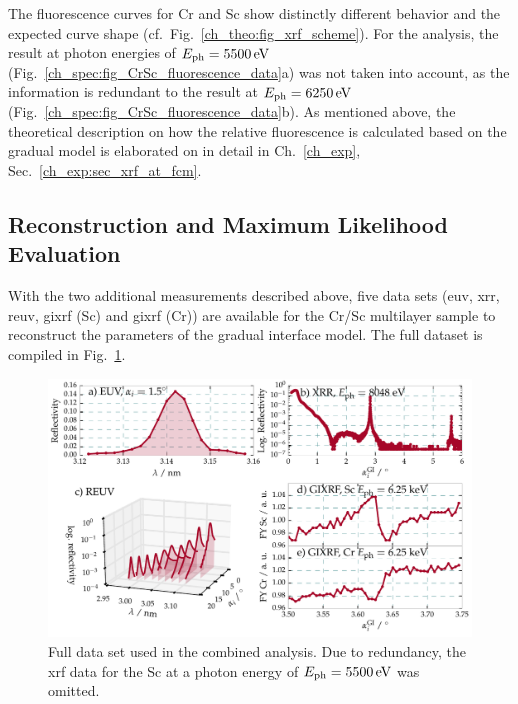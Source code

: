 The fluorescence curves for Cr and Sc show distinctly different behavior and the expected curve shape (cf.~Fig.~\ref{ch_theo:fig_xrf_scheme}). For the analysis, the result at photon energies of $E_\text{ph}=\ev{5500}$ (Fig.~\ref{ch_spec:fig_CrSc_fluorescence_data}a)  was not taken into account, as the information is redundant to the result at  $E_\text{ph}=\ev{6250}$ (Fig.~\ref{ch_spec:fig_CrSc_fluorescence_data}b). As mentioned above, the theoretical description on how the relative fluorescence is calculated based on the gradual model is elaborated on in detail in Ch.~\ref{ch_exp}, Sec.~\ref{ch_exp:sec_xrf_at_fcm}.

\subsection{Reconstruction and Maximum Likelihood Evaluation}
With the two additional measurements described above, five data sets (\gls{euv}, \gls{xrr}, \gls{reuv}, \gls{gixrf} (Sc) and \gls{gixrf} (Cr)) are available for the Cr/Sc multilayer sample to reconstruct the parameters of the gradual interface model. The full dataset is compiled in Fig.~\ref{ch_spec:fig_CrSc_all_data}.
\begin{figure}[htbp]
  \centering
  \includegraphics[width=\textwidth]{img/CrSc_all_data}
  \caption{Full data set used in the combined analysis. Due to redundancy, the \gls{xrf} data for the Sc at a photon energy of $E_\text{ph}=\ev{5500}$ was omitted.}
  \label{ch_spec:fig_CrSc_all_data}
\end{figure}

